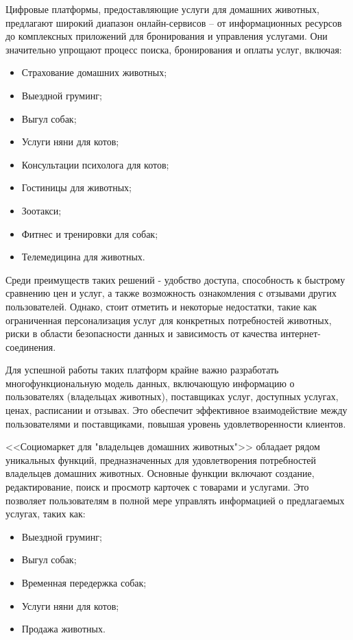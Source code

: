 Цифровые платформы, предоставляющие услуги для домашних животных, предлагают широкий диапазон онлайн-сервисов – от информационных ресурсов до комплексных приложений для бронирования и управления услугами. Они значительно упрощают процесс поиска, бронирования и оплаты услуг, включая:

\begin{itemize}
  \item Страхование домашних животных;
  \item Выездной груминг;
  \item Выгул собак;
  \item Услуги няни для котов;
  \item Консультации психолога для котов;
  \item Гостиницы для животных;
  \item Зоотакси;
  \item Фитнес и тренировки для собак;
  \item Телемедицина для животных.
\end{itemize}

Среди преимуществ таких решений - удобство доступа, способность к быстрому сравнению цен и услуг, а также возможность ознакомления с отзывами других пользователей. Однако, стоит отметить и некоторые недостатки, такие как ограниченная персонализация услуг для конкретных потребностей животных, риски в области безопасности данных и зависимость от качества интернет-соединения.

Для успешной работы таких платформ крайне важно разработать многофункциональную модель данных, включающую информацию о пользователях (владельцах животных), поставщиках услуг, доступных услугах, ценах, расписании и отзывах. Это обеспечит эффективное взаимодействие между пользователями и поставщиками, повышая уровень удовлетворенности клиентов.

<<Социомаркет для "владельцев домашних животных">> обладает рядом уникальных функций, предназначенных для удовлетворения потребностей владельцев домашних животных. Основные функции включают создание, редактирование, поиск и просмотр карточек с товарами и услугами. Это позволяет пользователям в полной мере управлять информацией о предлагаемых услугах, таких как:

\begin{itemize}
  \item Выездной груминг;
  \item Выгул собак;
  \item Временная передержка собак;
  \item Услуги няни для котов;
  \item Продажа животных.
\end{itemize}


